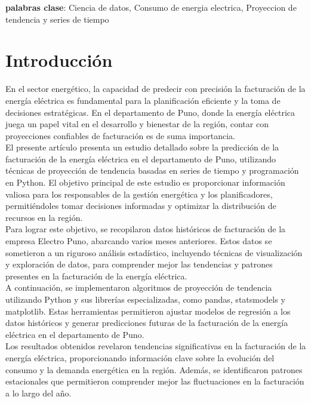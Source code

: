 \documentclass{article}
\begin{document}
\textbf{palabras clase}: Ciencia de datos, Consumo de energia electrica, Proyeccion de tendencia y series de tiempo

\section{Introducción}

En el sector energético, la capacidad de predecir con precisión la facturación de la energía eléctrica es fundamental para la planificación eficiente y la toma de decisiones estratégicas. En el departamento de Puno, donde la energía eléctrica juega un papel vital en el desarrollo y bienestar de la región, contar con proyecciones confiables de facturación es de suma importancia.
\\

El presente artículo presenta un estudio detallado sobre la predicción de la facturación de la energía eléctrica en el departamento de Puno, utilizando técnicas de proyección de tendencia basadas en series de tiempo y programación en Python. El objetivo principal de este estudio es proporcionar información valiosa para los responsables de la gestión energética y los planificadores, permitiéndoles tomar decisiones informadas y optimizar la distribución de recursos en la región.
\\

Para lograr este objetivo, se recopilaron datos históricos de facturación de la empresa Electro Puno, abarcando varios meses anteriores. Estos datos se sometieron a un riguroso análisis estadístico, incluyendo técnicas de visualización y exploración de datos, para comprender mejor las tendencias y patrones presentes en la facturación de la energía eléctrica.
\\

A continuación, se implementaron algoritmos de proyección de tendencia utilizando Python y sus librerías especializadas, como pandas, statsmodels y matplotlib. Estas herramientas permitieron ajustar modelos de regresión a los datos históricos y generar predicciones futuras de la facturación de la energía eléctrica en el departamento de Puno.
\\
 
Los resultados obtenidos revelaron tendencias significativas en la facturación de la energía eléctrica, proporcionando información clave sobre la evolución del consumo y la demanda energética en la región. Además, se identificaron patrones estacionales que permitieron comprender mejor las fluctuaciones en la facturación a lo largo del año.
\\
\end{document}
